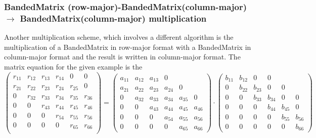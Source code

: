 \subsubsection{BandedMatrix (row-major)-BandedMatrix(column-major) $\rightarrow$ BandedMatrix(column-major) multiplication}
Another multiplication scheme, which involves a different algorithm is
the multiplication of a BandedMatrix in row-major format with a
BandedMatrix in column-major format and the result is written in column-major format.
The matrix equation for the given example is the
\begin{equation}
  \label{eq:bmatrbmatcbmatc}
  \left(\begin{array}{ccc|ccc}
      r_{11} &r_{12} &r_{13}& r_{14} & 0 & 0\\
      r_{21} &r_{22} &r_{23}& r_{24} & r_{25} & 0\\
      0 &r_{32} &r_{33}& r_{34} & r_{35} & r_{36}\\
      0 & 0 &r_{43}& r_{44} & r_{45} & r_{46} \\
      0 & 0 & 0 & r_{54} & r_{55} & r_{56} \\
      0 & 0 & 0 & 0 & r_{65} & r_{66}\\
    \end{array}\right) =
  \left(\begin{array}{cccccc}
      a_{11} &a_{12} &a_{13}& 0\\
      a_{21} &a_{22} &a_{23}& a_{24} & 0\\
      0 &a_{32} &a_{33}& a_{34} & a_{35} & 0\\ \hline
      0 & 0 &a_{43} &a_{44}& a_{45} & a_{46} \\
      0 & 0 &0 &a_{54} &a_{55}& a_{56}\\
      0 & 0 & 0 &0 &a_{65} &a_{66}
    \end{array}\right)
  \cdot
  \left(\begin{array}{ccc|ccc}
      b_{11} &b_{12} & 0 & 0\\
      0 &b_{22} &b_{23}& 0 & 0\\
      0 & 0 &b_{33}& b_{34} & 0 & 0\\
      0 & 0 & 0 &b_{44}& b_{45} & 0 \\
      0 & 0 & 0 & 0 &b_{55}& b_{56}\\
      0 & 0 & 0 & 0 & 0 &b_{66}
    \end{array}\right)
\end{equation}

